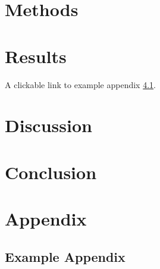 \documentclass{report}
\begin{document}
\chapter{Methods}
\noindent
\blindtext[2] %
\cite{lorem} %

\chapter{Results}
\noindent
\blindtext[2] %
A clickable link to example appendix \ref{Example Appendix}.

\chapter{Discussion}
\noindent
\blindtext[2] %

\chapter{Conclusion}
\noindent
\blindtext[2] %

\printbibliography[heading=bibintoc,title={References}]

\appendix
\chapter*{Appendix}
\renewcommand{\thesection}{\Alph{section}} %
\section{Example Appendix}
\label{Example Appendix}
\blindtext[2] %
\end{document}
